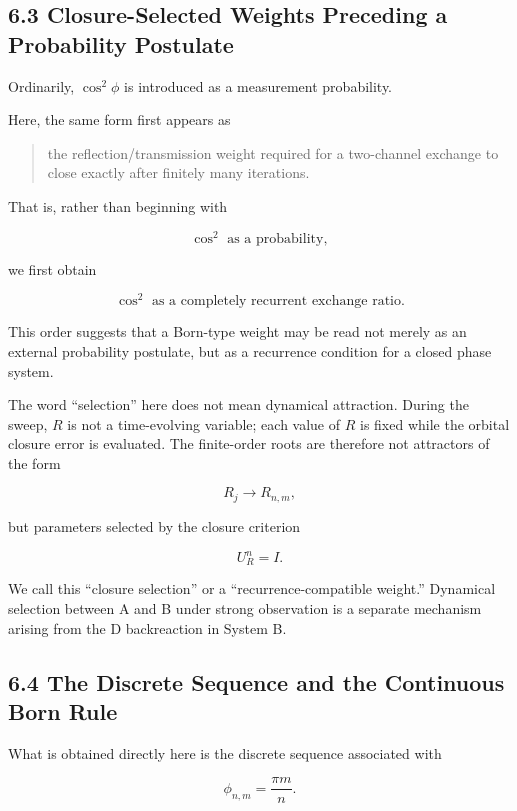\documentclass[
  a4paper,
  10pt]{article}
\begin{document}
\subsection{6.3 Closure-Selected Weights Preceding a Probability
Postulate}\label{63-closure-selected-weights-preceding-a-probability-postulate}

Ordinarily, \(\cos^2\phi\) is introduced as a measurement probability.

Here, the same form first appears as

\begin{quote}
the reflection/transmission weight required for a two-channel exchange
to close exactly after finitely many iterations.
\end{quote}

That is, rather than beginning with

\[
\cos^2 \text{ as a probability},
\]

we first obtain

\[
\cos^2 \text{ as a completely recurrent exchange ratio}.
\]

This order suggests that a Born-type weight may be read not merely as an
external probability postulate, but as a recurrence condition for a
closed phase system.

The word ``selection'' here does not mean dynamical attraction. During
the sweep, \(R\) is not a time-evolving variable; each value of \(R\) is
fixed while the orbital closure error is evaluated. The finite-order
roots are therefore not attractors of the form

\[
R_j\longrightarrow R_{n,m},
\]

but parameters selected by the closure criterion

\[
U_R^n=I.
\]

We call this ``closure selection'' or a ``recurrence-compatible
weight.'' Dynamical selection between A and B under strong observation
is a separate mechanism arising from the D backreaction in System B.

\subsection{6.4 The Discrete Sequence and the Continuous Born
Rule}\label{64-the-discrete-sequence-and-the-continuous-born-rule}

What is obtained directly here is the discrete sequence associated with

\[
\phi_{n,m}=\frac{\pi m}{n}.
\]
\end{document}
